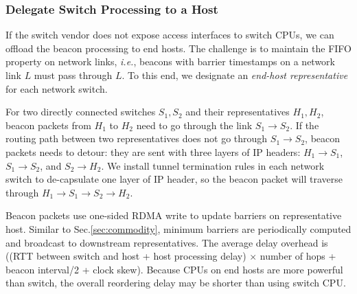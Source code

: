 \subsubsection{Delegate Switch Processing to a Host}
\label{sec:end-host}

If the switch vendor does not expose access interfaces to switch CPUs, we can offload the beacon processing to end hosts. The challenge is to maintain the FIFO property on network links, \emph{i.e.}, beacons with barrier timestamps on a network link $L$ must pass through $L$. To this end, we designate an \emph{end-host representative} for each network switch. %

For two directly connected switches $S_1, S_2$ and their representatives $H_1, H_2$, beacon packets from $H_1$ to $H_2$ need to go through the link $S_1 \rightarrow S_2$. If the routing path between two representatives does not go through $S_1 \rightarrow S_2$, beacon packets needs to detour: they are sent with three layers of IP headers: $H_1 \rightarrow S_1$, $S_1 \rightarrow S_2$, and $S_2 \rightarrow H_2$.
We install tunnel termination rules in each network switch to de-capsulate one layer of IP header, so the beacon packet will traverse through $H_1 \rightarrow S_1 \rightarrow S_2 \rightarrow H_2$.

Beacon packets use one-sided RDMA write to update barriers on representative host.
Similar to Sec.\ref{sec:commodity}, minimum barriers are periodically computed and broadcast to downstream representatives.
The average delay overhead is ((RTT between switch and host + host processing delay) $\times$ number of hops + beacon interval/2 + clock skew). Because CPUs on end hosts are more powerful than switch, the overall reordering delay may be shorter than using switch CPU.
